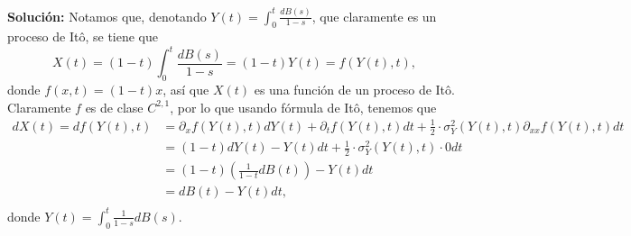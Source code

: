 \documentclass[letterpaper]{article}
\newcommand{\1}{\mathds{1}}
\theoremstyle{definition}
\theoremstyle{definition}
\theoremstyle{definition}
\theoremstyle{definition}
\theoremstyle{definition}
\begin{document}
\begin{enumerate}
    \textbf{Solución:} Notamos que, denotando $Y(t)=\int_0^t\frac{dB(s)}{1-s}$, que claramente es 
    un proceso de Itô, se tiene que 
    \[
    X(t)=(1-t)\int_0^t\frac{dB(s)}{1-s}=(1-t)Y(t)=f(Y(t),t),
    \]
    donde $f(x,t)=(1-t)x$, así que $X(t)$ es una función de un proceso de Itô. Claramente
    $f$ es de clase $C^{2,1}$, por lo que usando fórmula de Itô, tenemos que 
    \begin{align*}
      dX(t)=df(Y(t),t)&=\partial_x f\left(Y(t),t\right)dY(t)+\partial_t f\left(Y(t),t\right)dt +\frac{1}{2}\cdot\sigma^2_Y(Y(t),t)\partial_{xx} f(Y(t),t)dt\\
      &=(1-t)dY(t)-Y(t)dt+\frac{1}{2}\cdot\sigma^2_Y(Y(t),t)\cdot0dt\\
      &=(1-t)\left(\frac{1}{1-t}dB(t)\right)-Y(t)dt\\
      &=dB(t)-Y(t)dt,\\
     \end{align*}
     donde $Y(t)=\int_{0}^{t}\frac{1}{1-s}dB(s)$.



    
\end{enumerate}
\end{document}
